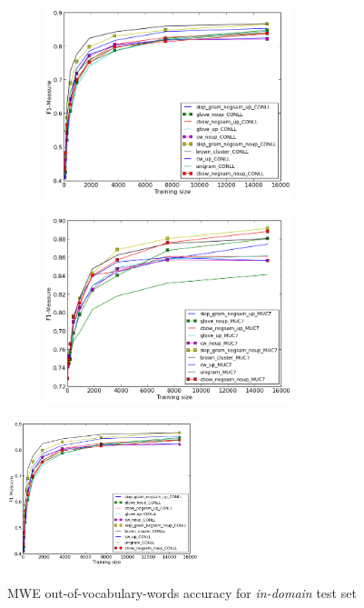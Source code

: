 \documentclass[11pt]{article}
\begin{document}
\begin{figure}
\caption{NER out-of-vocabulary-words accuracy for \textit{in-domain} and \textit{out-of-domain} test sets}
\centering
\begin{subfigure}{.5\textwidth}
	\centering
    	\includegraphics[width=0.8\textwidth]{plots/NERoutOfVocIN.png}
	\label{fig:inner}
\end{subfigure}
\begin{subfigure}{.5\textwidth}
	\centering
    	\includegraphics[width=0.8\textwidth]{plots/NERoutOfVocOUT.png}
	\label{fig:outner}
\end{subfigure}  	
\end{figure}


\begin{figure}
\caption{MWE out-of-vocabulary-words accuracy for \textit{in-domain} test set}
\centering
    	\includegraphics[width=0.5\textwidth]{plots/NERoutOfVocIN.png}    
\label{fig:outmwe}
\end{figure}
\end{document}
